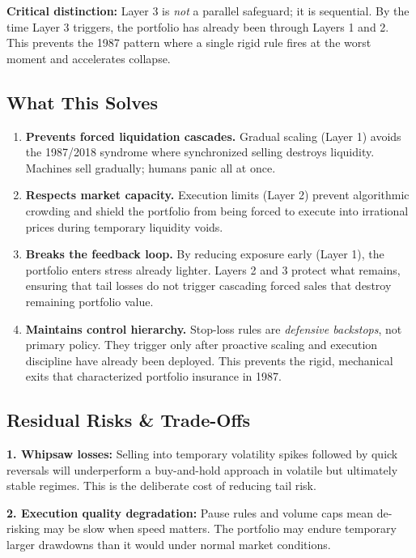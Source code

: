 \documentclass[12pt, a4paper]{article}
\begin{document}
\noindent\textbf{Critical distinction:} Layer 3 is \textit{not} a parallel safeguard; it is sequential. By the time Layer 3 triggers,
the portfolio has already been through Layers 1 and 2. This prevents the 1987 pattern where a single rigid rule fires
at the worst moment and accelerates collapse.

\subsection*{What This Solves}

\begin{enumerate}[leftmargin=1.5em, itemsep=4pt, topsep=4pt]
  \item \textbf{Prevents forced liquidation cascades.} Gradual scaling (Layer 1) avoids the 1987/2018 syndrome
    where synchronized selling destroys liquidity. Machines sell gradually; humans panic all at once.
  \item \textbf{Respects market capacity.} Execution limits (Layer 2) prevent algorithmic crowding and
    shield the portfolio from being forced to execute into irrational prices during temporary liquidity voids.
  \item \textbf{Breaks the feedback loop.} By reducing exposure early (Layer 1), the portfolio enters stress
    already lighter. Layers 2 and 3 protect what remains, ensuring that tail losses do not trigger cascading
    forced sales that destroy remaining portfolio value.
  \item \textbf{Maintains control hierarchy.} Stop-loss rules are \emph{defensive backstops}, not primary policy.
    They trigger only after proactive scaling and execution discipline have already been deployed. This prevents
    the rigid, mechanical exits that characterized portfolio insurance in 1987.
\end{enumerate}

\subsection*{Residual Risks \& Trade-Offs}

\noindent\textbf{1. Whipsaw losses:} Selling into temporary volatility spikes followed by quick reversals will
underperform a buy-and-hold approach in volatile but ultimately stable regimes. This is the deliberate cost
of reducing tail risk.

\noindent\textbf{2. Execution quality degradation:} Pause rules and volume caps mean de-risking may be slow when speed
matters. The portfolio may endure temporary larger drawdowns than it would under normal market conditions.
\end{document}
